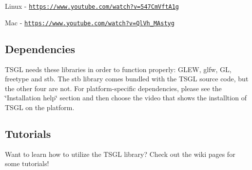 Linux -\/ \href{https://www.youtube.com/watch?v=547CmVftA1g}{\tt https\+://www.\+youtube.\+com/watch?v=547\+Cm\+Vft\+A1g}

Mac -\/ \href{https://www.youtube.com/watch?v=QlVh_MAstyg}{\tt https\+://www.\+youtube.\+com/watch?v=\+Ql\+Vh\+\_\+\+M\+Astyg} 

 \subsection*{Dependencies }

T\+S\+G\+L needs these libraries in order to function properly\+: G\+L\+E\+W, glfw, G\+L, freetype and stb. The stb library comes bundled with the T\+S\+G\+L source code, but the other four are not. For platform-\/specific dependencies, please see the \char`\"{}\+Installation help\char`\"{} section and then choose the video that shows the installtion of T\+S\+G\+L on the platform. 

 \subsection*{Tutorials }

Want to learn how to utilize the T\+S\+G\+L library? Check out the wiki pages for some tutorials! 